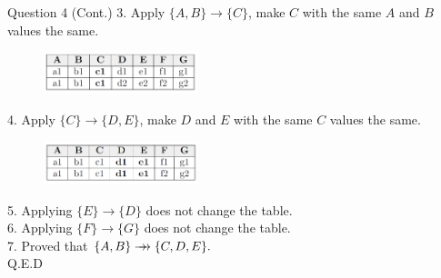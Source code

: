 \begin{frame}[fragile]{Question 4 (Cont.)}
	3. Apply $\{A,B\} \rightarrow \{C\}$, make $C$ with the same $A$ and $B$ values the same.\\
	\begin{figure}
		\includegraphics[width=0.4\textwidth, trim=0 0 0 0, clip]{4221-t5/images/4-3.png}
	\end{figure}
	
	4. Apply $\{C\} \rightarrow \{D,E\}$, make $D$ and $E$ with the same $C$ values the same.\\
	\begin{figure}
		\includegraphics[width=0.4\textwidth, trim=0 0 0 0, clip]{4221-t5/images/4-4.png}
	\end{figure}

	5. Applying $\{E\} \rightarrow \{D\}$ does not change the table.\\\vspace{5pt}
	6. Applying $\{F\} \rightarrow \{G\}$ does not change the table.\\\vspace{5pt}
	7. Proved that $\{A,B\} \mbox{$\; \rightarrow \! \! \! \! \rightarrow \; $} \{C,D,E\}.$\\
	\hfill Q.E.D
	
\end{frame}


